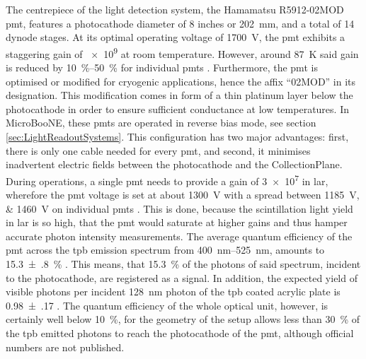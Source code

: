 The centrepiece of the light detection system, the Hamamatsu R5912-02MOD \gls{pmt}, features a photocathode diameter of \num{8} inches or \SI{202}{\milli\metre}, and a total of \num{14} dynode stages. At its optimal operating voltage of \SI{1700}{\volt}, the \gls{pmt} exhibits a staggering gain of \num{e9} at room temperature. However, around \SI{87}{\kelvin} said gain is reduced by \SIrange{10}{50}{\percent} for individual \glspl{pmt} \cite{MicroBooNEDetector}. Furthermore, the \gls{pmt} is optimised or modified for cryogenic applications, hence the affix ``02MOD'' in its designation. This modification comes in form of a thin platinum layer below the photocathode in order to ensure sufficient conductance at low temperatures. In MicroBooNE, these \glspl{pmt} are operated in reverse bias mode, see section \ref{sec:LightReadoutSystems}. This configuration has two major advantages: first, there is only one cable needed for every \gls{pmt}, and second, it minimises inadvertent electric fields between the photocathode and the \gls{CollectionPlane}. During operations, a single \gls{pmt} needs to provide a gain of \num{3e7} in \gls{lar}, wherefore the \gls{pmt} voltage is set at about \SI{1300}{\volt} with a spread between \SIlist{1185;1460}{\volt} on individual \glspl{pmt} \cite{MicroBooNEDetector}. This is done, because the scintillation light yield in \gls{lar} is so high, that the \gls{pmt} would saturate at higher gains and thus hamper accurate photon intensity measurements. The average quantum efficiency of the \gls{pmt} across the \gls{tpb} emission spectrum from \SIrange{400}{525}{\nano\metre}, amounts to \SI{15.3(8)}{\percent} \cite{MicroBooNEDetector}. This means, that \SI{15.3}{\percent} of the photons of said spectrum, incident to the photocathode, are registered as a signal. In addition, the expected yield of visible photons per incident \SI{128}{\nano\metre} photon of the \gls{tpb} coated acrylic plate is \num{0.98(17)} \cite{MicroBooNEDetector}. The quantum efficiency of the whole optical unit, however, is certainly well below \SI{10}{\percent}, for the geometry of the setup allows less than \SI{30}{\percent} of the \gls{tpb} emitted photons to reach the photocathode of the \gls{pmt}, although official numbers are not published.

